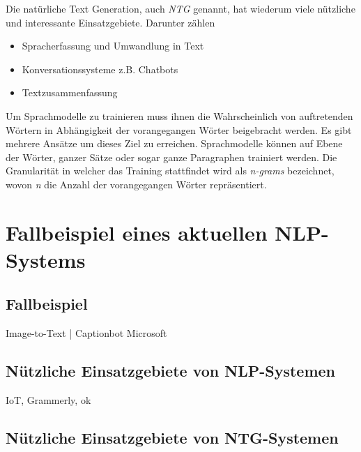 Die natürliche Text Generation, auch \textit{NTG} genannt, hat wiederum viele nützliche und interessante Einsatzgebiete. Darunter zählen  
\begin{itemize}
\item Spracherfassung und Umwandlung in Text
\item Konversationssysteme z.B. Chatbots
\item Textzusammenfassung
\end{itemize} 

Um Sprachmodelle zu trainieren muss ihnen die Wahrscheinlich von auftretenden Wörtern in Abhängigkeit der vorangegangen Wörter beigebracht werden. Es gibt mehrere Ansätze um dieses Ziel zu erreichen. Sprachmodelle können auf Ebene der Wörter, ganzer Sätze oder sogar ganze Paragraphen trainiert werden. Die Granularität in welcher das Training stattfindet wird als \textit{n-grams} bezeichnet, wovon  \textit{n} die Anzahl der vorangegangen Wörter repräsentiert.

\section{Fallbeispiel eines aktuellen NLP-Systems}

\subsection{Fallbeispiel}

Image-to-Text | Captionbot Microsoft

\subsection{Nützliche Einsatzgebiete von NLP-Systemen}

IoT, Grammerly, ok

\subsection{Nützliche Einsatzgebiete von NTG-Systemen}